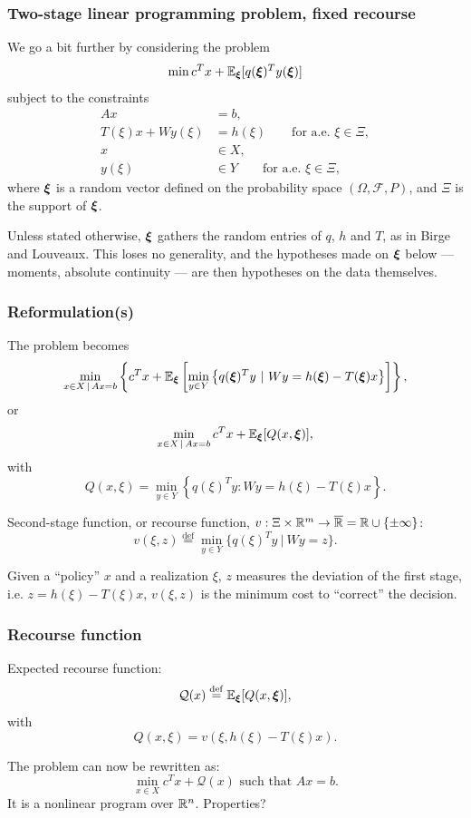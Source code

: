 \documentclass[aspectratio=169]{beamer}
\begin{document}
\begin{frame}
\frametitle{Two-stage linear programming problem, fixed recourse}

We go a bit further by considering the problem
\[
\min c^Tx + {\mathbb{E}}_{{\boldsymbol{\xi}}}[q({\boldsymbol{\xi}})^Ty({\boldsymbol{\xi}})]
\]
subject to the constraints
\begin{align*}
Ax &= b, \\
T(\xi)x + Wy(\xi) &= h(\xi) \qquad \text{for a.e. } \xi \in \Xi, \\
x & \in X, \\
y(\xi) & \in Y \qquad \text{for a.e. } \xi \in \Xi,
\end{align*}
where ${\boldsymbol{\xi}}$ is a random vector defined on the probability space
$(\Omega, \mathcal{F}, P)$, and $\Xi$ is the support of ${\boldsymbol{\xi}}$.

\mbox{}

Unless stated otherwise, ${\boldsymbol{\xi}}$ {\red gathers the random entries} of $q$, $h$ and $T$, as in Birge and Louveaux.
This loses no generality, and the hypotheses made on ${\boldsymbol{\xi}}$ below --- moments, absolute continuity --- are then hypotheses on the data themselves.

\end{frame}

\begin{frame}
\frametitle{Reformulation(s)}

The problem becomes
\[
\min_{x \in X \,|\, Ax = b} \left\lbrace c^Tx + {\mathbb{E}}_{{\boldsymbol{\xi}}} \left[ \min_{y \in Y} \left\lbrace q({\boldsymbol{\xi}})^Ty \ |\ Wy = h({\boldsymbol{\xi}}) - T({\boldsymbol{\xi}})x \right\rbrace \right] \right\rbrace,
\]
or
\[
\min_{x \in X \,|\, Ax = b} c^Tx + {\mathbb{E}}_{{\boldsymbol{\xi}}} [ Q(x,{\boldsymbol{\xi}})], 
\]
with
\[
Q(x, \xi) = \min_{y \in Y} \left\lbrace q(\xi)^Ty: Wy = h(\xi) - T(\xi)x \right\rbrace.
\]

\smallskip

{\red Second-stage function}, or {\red recourse function}, $v: \Xi \times {\mathbb{R}}^m \rightarrow \overline{{\mathbb{R}}} = {\mathbb{R}} \cup \lbrace \pm\infty \rbrace$:
\[
v(\xi, z) \overset{\mathrm{def}}{=} \min_{y \in Y} \lbrace q(\xi)^Ty \ |\ Wy = z \rbrace.
\]

\smallskip

Given a ``policy'' $x$ and a realization $\xi$, $z$ measures the deviation of the first stage, i.e. $z = h(\xi) - T(\xi)x$, $v(\xi, z)$ is the minimum cost to ``correct'' the decision. %

\end{frame}

\begin{frame}
\frametitle{Recourse function}

{\red Expected recourse function}:
\[
\mathcal{Q}(x) \overset{\mathrm{def}}{=} {\mathbb{E}}_{{\boldsymbol{\xi}}}[Q(x,{\boldsymbol{\xi}})],
\]
with
\[
Q(x, \xi) = v(\xi, h(\xi)-T(\xi)x).
\]

\mbox{}

The problem can now be rewritten as:
\[
\min_{x \in X} c^Tx + \mathcal{Q}(x) \mbox{ such that } Ax = b.
\]
It is a nonlinear program over ${\mathbb{R}}^n$. Properties?
\end{frame}
\end{document}
